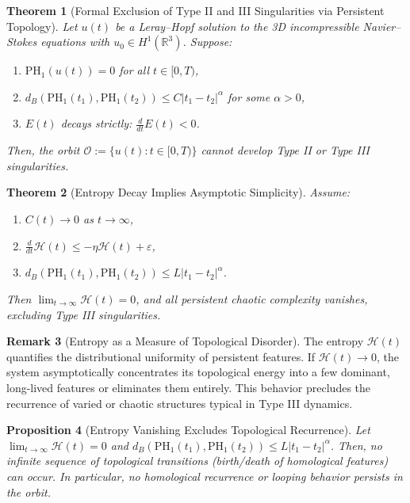 \documentclass[11pt]{article}
\newtheorem{theorem}{Theorem}[section]
\newtheorem{proposition}[theorem]{Proposition}
\theoremstyle{definition}
\newtheorem{remark}[theorem]{Remark}
\begin{document}
\begin{theorem}[Formal Exclusion of Type II and III Singularities via Persistent Topology]
\label{thm:formal_typeII_III_exclusion}
Let $u(t)$ be a Leray--Hopf solution to the 3D incompressible Navier--Stokes equations with $u_0 \in H^1(\mathbb{R}^3)$. Suppose:
\begin{enumerate}
    \item $\mathrm{PH}_1(u(t)) = 0$ for all $t \in [0, T)$,
    \item $d_B(\mathrm{PH}_1(t_1), \mathrm{PH}_1(t_2)) \le C |t_1 - t_2|^\alpha$ for some $\alpha > 0$,
    \item $E(t)$ decays strictly: $\frac{d}{dt} E(t) < 0$.
\end{enumerate}
Then, the orbit $\mathcal{O} := \{u(t): t \in [0,T)\}$ cannot develop Type II or Type III singularities.
\end{theorem}

\begin{theorem}[Entropy Decay Implies Asymptotic Simplicity]
Assume:
\begin{enumerate}
    \item $C(t) \to 0$ as $t \to \infty$,
    \item $\frac{d}{dt} \mathcal{H}(t) \le -\eta \mathcal{H}(t) + \varepsilon$,
    \item $d_B(\mathrm{PH}_1(t_1), \mathrm{PH}_1(t_2)) \le L|t_1 - t_2|^\alpha$.
\end{enumerate}
Then $\lim_{t \to \infty} \mathcal{H}(t) = 0$, and all persistent chaotic complexity vanishes, excluding Type III singularities.
\end{theorem}

\begin{remark}[Entropy as a Measure of Topological Disorder]
The entropy $\mathcal{H}(t)$ quantifies the distributional uniformity of persistent features. If $\mathcal{H}(t) \to 0$, the system asymptotically concentrates its topological energy into a few dominant, long-lived features or eliminates them entirely. This behavior precludes the recurrence of varied or chaotic structures typical in Type III dynamics.
\end{remark}

\begin{proposition}[Entropy Vanishing Excludes Topological Recurrence]
Let $\lim_{t \to \infty} \mathcal{H}(t) = 0$ and $d_B(\mathrm{PH}_1(t_1), \mathrm{PH}_1(t_2)) \le L |t_1 - t_2|^\alpha$. Then, no infinite sequence of topological transitions (birth/death of homological features) can occur. In particular, no homological recurrence or looping behavior persists in the orbit.
\end{proposition}
\end{document}
